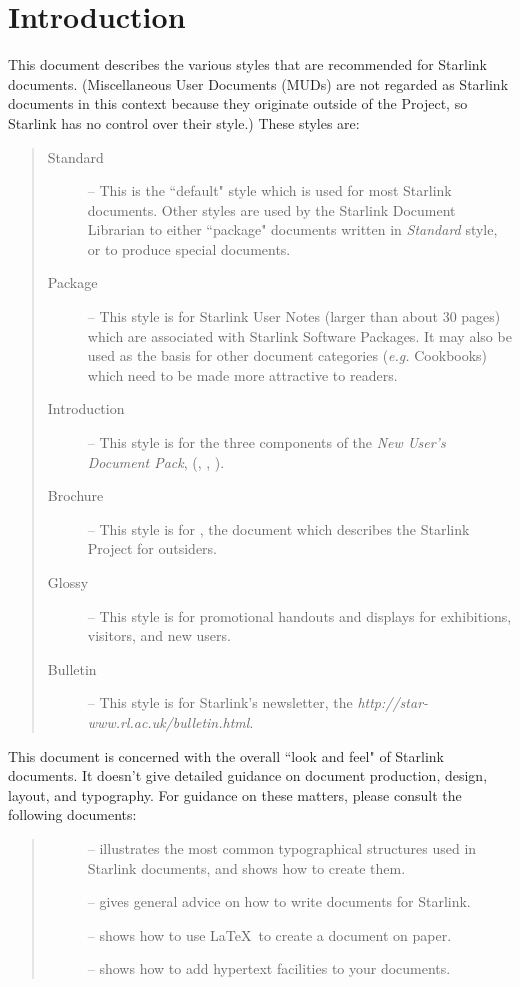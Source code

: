 
\section{\label{introduction}Introduction}

This document describes the various styles that are recommended for Starlink
documents.
(Miscellaneous User Documents (MUDs) are not regarded as Starlink documents
in this context because they originate outside of the Project, so Starlink has
no control over their style.)
These styles are:
\begin{quote}
\begin{description}
\item [Standard] --
This is the ``default" style which is used for most Starlink documents.
Other styles are used by the Starlink Document Librarian to either
``package" documents written in {\em Standard} style, or to produce special
documents.
\item [Package] --
This style is for Starlink User Notes (larger than about 30 pages) which are
associated with Starlink Software Packages.
It may also be used as the basis for other document categories ({\em e.g.}
Cookbooks) which need to be made more attractive to readers.
\item [Introduction] --
This style is for the three components of the {\em New User's Document Pack},
(,
 ,
 ).
\item [Brochure] --
This style is for
,
the document which describes the Starlink Project for outsiders.
\item [Glossy] --
This style is for promotional handouts and displays for exhibitions, visitors,
and new users.
\item [Bulletin] --
This style is for Starlink's newsletter, the
{\em {}
{http://star-www.rl.ac.uk/bulletin.html}}.
\end{description}
\end{quote}
This document is concerned with the overall ``look and feel" of Starlink
documents.
It doesn't give detailed guidance on document production, design, layout, and
typography.
For guidance on these matters, please consult the following documents:
\begin{quote}
\begin{description}
\item [] --
 illustrates the most common typographical structures used in Starlink
 documents, and shows how to create them.
\item [] --
 gives general advice on how to write documents for Starlink.
\item [] --
 shows how to use \LaTeX\ to create a document on paper.
\item [] -- 
 shows how to add hypertext facilities to your documents.
\end{description}
\end{quote}

